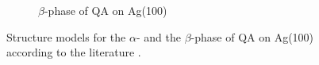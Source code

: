 \begin{figure}[htbp]
\begin{subfigure}[b]{0.49\linewidth}
		\caption{$\beta$-phase of \ac{QA} on Ag(100)}
	\end{subfigure}
	\caption{Structure models for the $\alpha$- and the $\beta$-phase of \ac{QA} on Ag(100) according to the literature \cite{Humberg2024}.}
	\label{fig:structures_literature}
\end{figure}

\cleardoublepage